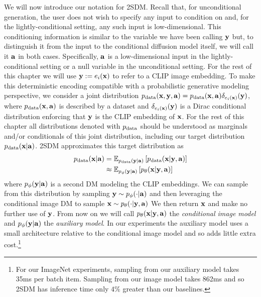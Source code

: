 We will now introduce our notation for 2SDM. Recall that, for unconditional generation, the user does not wish to specify any input to condition on and, for the lightly-conditional setting, any such input is low-dimensional. This conditioning information is similar to the variable we have been calling ${\mathbf{y}}$ but, to distinguish it from the input to the conditional diffusion model itself, we will call it ${\mathbf{a}}$ in both cases. Specifically, ${\mathbf{a}}$ is a low-dimensional input in the lightly-conditional setting or a null variable in the unconditional setting. For the rest of this chapter we will use ${\mathbf{y}} := e_i({\mathbf{x}})$ to refer to a CLIP image embedding. To make this deterministic encoding compatible with a probabilistic generative modeling perspective, we consider a joint distribution $p_{\rm{data}}({\mathbf{x}}, {\mathbf{y}}, {\mathbf{a}})=p_{\rm{data}}({\mathbf{x}}, {\mathbf{a}})\delta_{e_i({\mathbf{x}})}({\mathbf{y}})$, where $p_{\rm{data}}({\mathbf{x}}, {\mathbf{a}})$ is described by a dataset and $\delta_{e_i({\mathbf{x}})}({\mathbf{y}})$ is a Dirac conditional distribution enforcing that ${\mathbf{y}}$ is the CLIP embedding of ${\mathbf{x}}$. For the rest of this chapter all distributions denoted with $p_{\rm{data}}$ should be understood as marginals and/or conditionals of this joint distribution, including our target distribution $p_{\rm{data}}({\mathbf{x}}|{\mathbf{a}})$. 2SDM approximates this target distribution as
%
\begin{align} \label{eq:no-a}
    \pdata(\rvx|\rva) &= \mathbb{E}_{\pdata(\rvy|\rva)} \left[ \pdata(\rvx|\rvy,\rva) \right] \\
    &\approx \mathbb{E}_{p_\phi(\rvy|\rva)} \left[ p_\theta(\rvx|\rvy,\rva) \right] %
\end{align}
where $p_\phi({\mathbf{y}}|{\mathbf{a}})$ is a second DM modeling the CLIP embeddings. We can sample from this distribution by sampling ${\mathbf{y}}\sim p_\phi(\cdot|{\mathbf{a}})$ and then leveraging the conditional image DM to sample ${\mathbf{x}} \sim p_\theta(\cdot|{\mathbf{y}},{\mathbf{a}})$ We then return ${\mathbf{x}}$ and make no further use of ${\mathbf{y}}$.
%
From now on we will call $p_\theta({\mathbf{x}}|{\mathbf{y}},{\mathbf{a}})$ the \textit{conditional image model} and $p_\phi({\mathbf{y}}|{\mathbf{a}})$ the \textit{auxiliary model}. In our experiments the auxiliary model uses a small architecture relative to the conditional image model and so adds little extra cost.\footnote{For our ImageNet experiments, sampling from our auxiliary model takes 35ms per batch item. Sampling from our image model takes 862ms and so 2SDM has inference time only $4\%$ greater than our baselines.}


